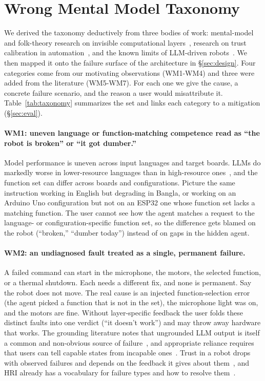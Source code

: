 \documentclass[sigconf]{acmart}
\begin{document}
\section{Wrong Mental Model Taxonomy}\label{sec:taxonomy}

We derived the taxonomy deductively from three bodies of work: mental-model and folk-theory research on invisible computational layers~\cite{gero2020mental, eslami2015always, eslami2016first, devito2017algorithms}, research on trust calibration in automation~\cite{lee2004trust}, and the known limits of LLM-driven robots~\cite{ahn2022saycan, liu2024lost}. We then mapped it onto the failure surface of the architecture in \S\ref{sec:design}. Four categories come from our motivating observations (WM1-WM4) and three were added from the literature (WM5-WM7). For each one we give the cause, a concrete failure scenario, and the reason a user would misattribute it. Table~\ref{tab:taxonomy} summarizes the set and links each category to a mitigation (\S\ref{sec:eval}).

\paragraph{WM1: uneven language or function-matching competence read as ``the robot is broken'' or ``it got dumber.''}
Model performance is uneven across input languages and target boards. LLMs do markedly worse in lower-resource languages than in high-resource ones~\cite{joshi2020state}, and the function set can differ across boards and configurations. Picture the same instruction working in English but degrading in Bangla, or working on an Arduino Uno configuration but not on an ESP32 one whose function set lacks a matching function. The user cannot see how the agent matches a request to the language- or configuration-specific function set, so the difference gets blamed on the robot (``broken,'' ``dumber today'') instead of on gaps in the hidden agent.

\paragraph{WM2: an undiagnosed fault treated as a single, permanent failure.}
A failed command can start in the microphone, the motors, the selected function, or a thermal shutdown. Each needs a different fix, and none is permanent. Say the robot does not move. The real cause is an injected function-selection error (the agent picked a function that is not in the set), the microphone light was on, and the motors are fine. Without layer-specific feedback the user folds these distinct faults into one verdict (``it doesn't work'') and may throw away hardware that works. The grounding literature notes that ungrounded LLM output is itself a common and non-obvious source of failure~\cite{ahn2022saycan}, and appropriate reliance requires that users can tell capable states from incapable ones~\cite{lee2004trust}. Trust in a robot drops with observed failures and depends on the feedback it gives about them~\cite{desai2013impact, salem2015would}, and HRI already has a vocabulary for failure types and how to resolve them~\cite{honig2018understanding}.
\end{document}
